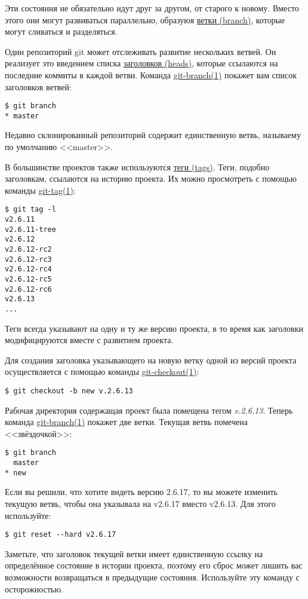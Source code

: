 \documentclass[a4paper, 12pt, oneside]{scrreprt}
\begin{document}
Эти состояния не обязательно идут друг за другом, от старого к новому. Вместо этого
они могут развиваться параллельно, образуюя \href{#def_branch}{ветки (branch)},
которые могут сливаться и разделяться.

Один репозиторий git может отслеживать развитие нескольких ветвей. Он реализует это
введением списка \href{#def_head}{заголовков (heads)}, которые ссылаются на
последние коммиты в каждой ветви. Команда \href{http://www.kernel.org/pub/software/scm/git/docs/git-branch.html}{git-branch(1)}
покажет вам список заголовков ветвей:

\begin{lstlisting}
$ git branch
* master
\end{lstlisting}

Недавно склонированный репозиторий содержит единственную ветвь, называему по умолчанию
<<master>>.

В большинстве проектов также используются \href{#def_tag}{теги (tags)}. Теги, подобно
заголовкам, ссылаются на историю проекта. Их можно просмотреть с помощью команды
\href{http://www.kernel.org/pub/software/scm/git/docs/git-tag.html}{git-tag(1)}:

\begin{lstlisting}
$ git tag -l
v2.6.11
v2.6.11-tree
v2.6.12
v2.6.12-rc2
v2.6.12-rc3
v2.6.12-rc4
v2.6.12-rc5
v2.6.12-rc6
v2.6.13
...
\end{lstlisting}

Теги всегда указывают на одну и ту же версию проекта, в то время как заголовки
модифицируются вместе с развитием проекта.

Для создания заголовка указывающего на новую ветку одной из версий проекта
осуществляется с помощью команды
\href{http://www.kernel.org/pub/software/scm/git/docs/git-checkout.html}{git-checkout(1)}:

\begin{lstlisting}
$ git checkout -b new v.2.6.13
\end{lstlisting}

Рабочая директория содержащая проект была помещена тегом \emph{v.2.6.13}. Теперь
команда \href{http://www.kernel.org/pub/software/scm/git/docs/git-branch.html}{git-branch(1)}
покажет две ветки. Текущая ветвь помечена <<звёздочкой>>:

\begin{lstlisting}
$ git branch
  master
* new
\end{lstlisting}

Если вы решили, что хотите видеть версию 2.6.17, то вы можете изменить текущую ветвь,
чтобы она указывала на v2.6.17 вместо v2.6.13. Для этого используйте:

\begin{lstlisting}
$ git reset --hard v2.6.17
\end{lstlisting}

Заметьте, что заголовок текущей ветки имеет единственную ссылку на определённое состояние
в истории проекта, поэтому его сброс может лишить вас возможности возвращаться в
предыдущие состояния. Используйте эту команду с осторожностью.


%
%
\end{document}
